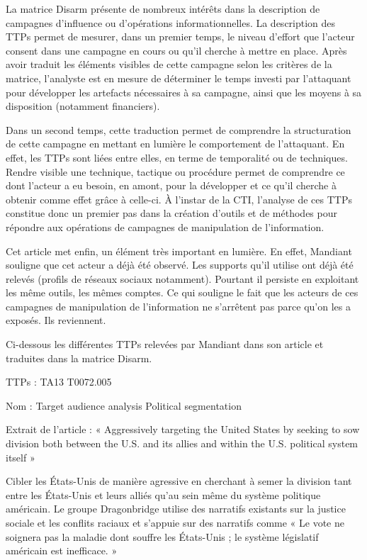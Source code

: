 La matrice Disarm présente de nombreux intérêts dans la description de campagnes d’influence ou d’opérations informationnelles. La description des TTPs permet de mesurer, dans un premier temps, le niveau d’effort que l’acteur consent dans une campagne en cours ou qu’il cherche à mettre en place. Après avoir traduit les éléments visibles de cette campagne selon les critères de la matrice, l’analyste est en mesure de déterminer le temps investi par l’attaquant pour développer les artefacts nécessaires à sa campagne, ainsi que les moyens à sa disposition (notamment financiers). 

Dans un second temps, cette traduction permet de comprendre la structuration de cette campagne en mettant en lumière le comportement de l’attaquant. En effet, les TTPs sont liées entre elles, en terme de temporalité ou de techniques. Rendre visible une technique, tactique ou procédure permet de comprendre ce dont l’acteur a eu besoin, en amont, pour la développer et ce qu’il cherche à obtenir comme effet grâce à celle-ci. À l’instar de la CTI, l’analyse de ces TTPs constitue donc un premier pas dans la création d’outils et de méthodes pour répondre aux opérations de campagnes de manipulation de l'information.

Cet article met enfin, un élément très important en lumière. En effet, Mandiant souligne que cet acteur a déjà été observé. Les supports qu’il utilise ont déjà été relevés (profils de réseaux sociaux notamment). Pourtant il persiste en exploitant les même outils, les mêmes comptes. Ce qui souligne le fait que les acteurs de ces campagnes de manipulation de l'information ne s’arrêtent pas parce qu’on les a exposés. Ils reviennent.

Ci-dessous les différentes TTPs relevées par Mandiant dans son article et traduites dans la matrice Disarm.

TTPs : TA13 T0072.005 

Nom : Target audience analysis Political segmentation

Extrait de l’article : « Aggressively targeting the United States by seeking to sow division both between the U.S. and its allies and within the U.S. political system itself »

Cibler les États-Unis de manière agressive en cherchant à semer la division tant entre les États-Unis et leurs alliés qu'au sein même du système politique américain. Le groupe Dragonbridge utilise des narratifs existants sur la justice sociale et les conflits raciaux et s'appuie sur des narratifs comme « Le vote ne soignera pas la maladie dont souffre les États-Unis ; le système législatif américain est inefficace. »

